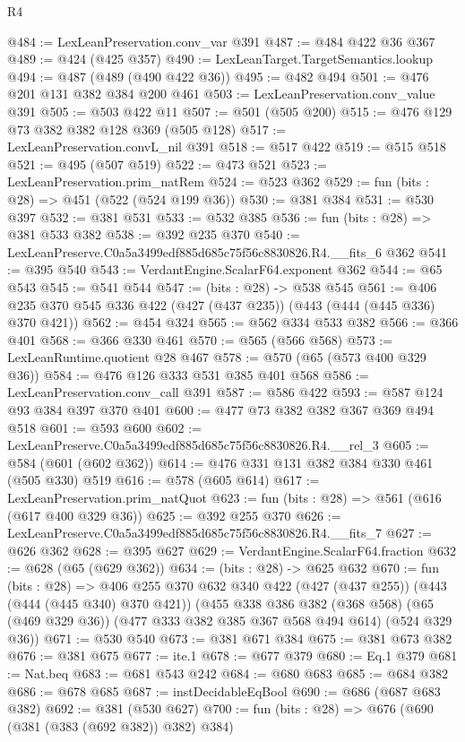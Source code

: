 \begin{lexlean}{R4}
\begin{coremodule}
@484 := LexLeanPreservation.conv_var @391
@487 := @484 @422 @36 @367
@489 := @424 (@425 @357)
@490 := LexLeanTarget.TargetSemantics.lookup
@494 := @487 (@489 (@490 @422 @36))
@495 := @482 @494
@501 := @476 @201 @131 @382 @384 @200 @461
@503 := LexLeanPreservation.conv_value @391
@505 := @503 @422 @11
@507 := @501 (@505 @200)
@515 := @476 @129 @73 @382 @382 @128 @369 (@505 @128)
@517 := LexLeanPreservation.convL_nil @391
@518 := @517 @422
@519 := @515 @518
@521 := @495 (@507 @519)
@522 := @473 @521
@523 := LexLeanPreservation.prim_natRem
@524 := @523 @362
@529 := fun (bits : @28) => @451 (@522 (@524 @199 @36))
@530 := @381 @384
@531 := @530 @397
@532 := @381 @531
@533 := @532 @385
@536 := fun (bits : @28) => @381 @533 @382
@538 := @392 @235 @370
@540 := LexLeanPreserve.C0a5a3499edf885d685c75f56c8830826.R4.__fits_6 @362
@541 := @395 @540
@543 := VerdantEngine.ScalarF64.exponent @362
@544 := @65 @543
@545 := @541 @544
@547 := (bits : @28) -> @538 @545
@561 := @406 @235 @370 @545 @336 @422 (@427 (@437 @235)) (@443 (@444 (@445 @336) @370 @421))
@562 := @454 @324
@565 := @562 @334 @533 @382
@566 := @366 @401
@568 := @366 @330 @461
@570 := @565 (@566 @568)
@573 := LexLeanRuntime.quotient @28 @467
@578 := @570 (@65 (@573 @400 @329 @36))
@584 := @476 @126 @333 @531 @385 @401 @568
@586 := LexLeanPreservation.conv_call @391
@587 := @586 @422
@593 := @587 @124 @93 @384 @397 @370 @401
@600 := @477 @73 @382 @382 @367 @369 @494 @518
@601 := @593 @600
@602 := LexLeanPreserve.C0a5a3499edf885d685c75f56c8830826.R4.__rel_3
@605 := @584 (@601 (@602 @362))
@614 := @476 @331 @131 @382 @384 @330 @461 (@505 @330) @519
@616 := @578 (@605 @614)
@617 := LexLeanPreservation.prim_natQuot
@623 := fun (bits : @28) => @561 (@616 (@617 @400 @329 @36))
@625 := @392 @255 @370
@626 := LexLeanPreserve.C0a5a3499edf885d685c75f56c8830826.R4.__fits_7
@627 := @626 @362
@628 := @395 @627
@629 := VerdantEngine.ScalarF64.fraction
@632 := @628 (@65 (@629 @362))
@634 := (bits : @28) -> @625 @632
@670 := fun (bits : @28) =>
  @406
    @255
    @370
    @632
    @340
    @422
    (@427 (@437 @255))
    (@443 (@444 (@445 @340) @370 @421))
    (@455
      @338
      @386
      @382
      (@368 @568)
      (@65 (@469 @329 @36))
      (@477 @333 @382 @385 @367 @568 @494 @614)
      (@524 @329 @36))
@671 := @530 @540
@673 := @381 @671 @384
@675 := @381 @673 @382
@676 := @381 @675
@677 := ite.{1}
@678 := @677 @379
@680 := Eq.{1} @379
@681 := Nat.beq
@683 := @681 @543 @242
@684 := @680 @683
@685 := @684 @382
@686 := @678 @685
@687 := instDecidableEqBool
@690 := @686 (@687 @683 @382)
@692 := @381 (@530 @627)
@700 := fun (bits : @28) => @676 (@690 (@381 (@383 (@692 @382)) @382) @384)

\end{coremodule}
\end{lexlean}

